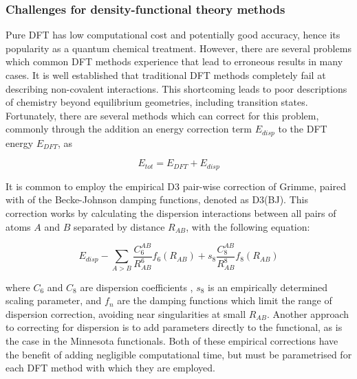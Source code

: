 \subsubsection{Challenges for density-functional theory methods}

Pure DFT has low computational cost and potentially good accuracy, hence its popularity as a quantum chemical treatment. However, there are several problems which common DFT methods experience that lead to erroneous results in many cases.\cite{Cohen2012} It is well established that traditional DFT methods completely fail at describing non-covalent interactions.\cite{DiLabio2016} This shortcoming leads to poor descriptions of chemistry beyond equilibrium geometries, including transition states. Fortunately, there are several methods which can correct for this problem, commonly through the addition an energy correction term $E_{disp}$ to the DFT energy $E_{DFT}$, as

\begin{equation}
  E_{tot} = E_{DFT} + E_{disp}
\end{equation}

\noindent It is common to employ the empirical D3 pair-wise correction of Grimme,\cite{Grimme2010} paired with of the Becke-Johnson damping functions,\cite{Johnson2006} denoted as D3(BJ). This correction works by calculating the dispersion interactions between all pairs of atoms $A$ and $B$ separated by distance $R_{AB}$, with the following equation:

\begin{equation}
  E_{disp} - \sum_{A>B} \frac{C_6^{AB}}{R_{AB}^6} f_6(R_{AB}) + s_8
  \frac{C_8^{AB}}{R_{AB}^8} f_8(R_{AB})
\end{equation}

\noindent where $C_6$ and $C_8$ are dispersion coefficients , $s_8$ is an empirically determined scaling parameter, and $f_n$ are the damping functions which limit the range of dispersion correction, avoiding near singularities at small $R_{AB}$. Another approach to correcting for dispersion is to add parameters directly to the functional, as is the case in the Minnesota functionals.\cite{Zhao2006,Zhao2006} Both of these empirical corrections have the benefit of adding negligible computational time, but must be parametrised for each DFT method with which they are employed.


